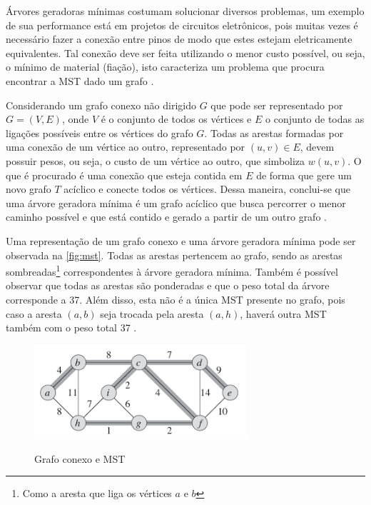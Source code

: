\par Árvores geradoras mínimas costumam solucionar diversos problemas, um exemplo de sua performance está em projetos de circuitos eletrônicos, pois muitas vezes é necessário fazer a conexão entre pinos de modo que estes estejam eletricamente equivalentes. Tal conexão deve ser feita utilizando o menor custo possível, ou seja, o mínimo de material (fiação), isto caracteriza um problema que procura encontrar a MST dado um grafo \cite{algoritmos}.

\par Considerando um grafo conexo não dirigido $G$ que pode ser representado por $G = (V, E)$, onde $V$ é o conjunto de todos os vértices e $E$ o conjunto de todas as ligações possíveis entre os vértices do grafo $G$. Todas as arestas formadas por uma conexão de um vértice ao outro, representado por $(u, v) \in E$, devem possuir pesos, ou seja, o custo de um vértice ao outro, que simboliza $w(u, v)$. O que é procurado é uma conexão que esteja contida em $E$ de forma que gere um novo grafo $T$ acíclico e conecte todos os vértices. Dessa maneira, conclui-se que uma árvore geradora mínima é um grafo acíclico que busca percorrer o menor caminho possível e que está contido e gerado a partir de um outro grafo \cite{algoritmos}.

\par Uma representação de um grafo conexo e uma árvore geradora mínima pode ser observada na \autoref{fig:mst}. Todas as arestas pertencem ao grafo, sendo as arestas sombreadas\footnote{Como a aresta que liga os vértices $a$ e $b$} correspondentes à árvore geradora mínima. Também é possível observar que todas as arestas são ponderadas e que o peso total da árvore corresponde a 37. Além disso, esta não é a única MST presente no grafo, pois caso a aresta $(a, b)$ seja trocada pela aresta $(a, h)$, haverá outra MST também com o peso total 37 \cite{algoritmos}.

\begin{figure}[!h]
    \centering
    \caption{Grafo conexo e MST}
    \includegraphics[width=0.7\textwidth]{./dados/figuras/grafo-mst.png}
    \label{fig:mst}
\end{figure}

